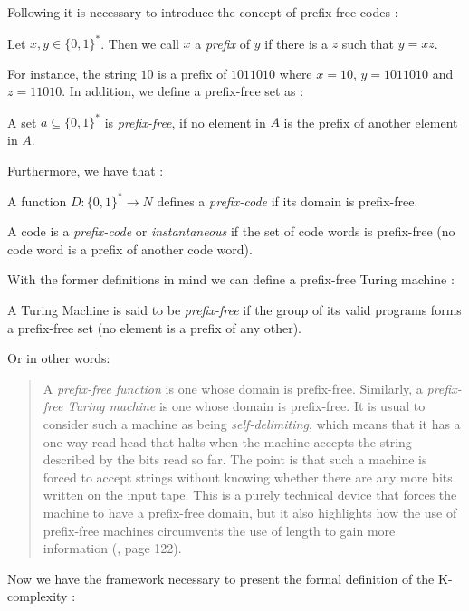 Following it is necessary to introduce the concept of prefix-free codes \cite{kolmo_book}:

\begin{defn}
Let $x,y \in \{0,1\}^{*}$. Then we call $x$ a \textit{prefix} of $y$ if there is a $z$ such that $y=xz$.
\end{defn}

For instance, the string $10$ is a prefix of $1011010$ where $x=10$, $y=1011010$ and $z=11010$.  In addition, we define a prefix-free set as \cite{kolmo_book}:

\begin{defn}
A set $a \subseteq \{0,1\}^{*}$ is \textit{prefix-free}, if no element in $A$ is the prefix of another element in $A$.
\end{defn}

Furthermore, we have that \cite{kolmo_book}:
\begin{defn}
A function $D: \{0,1\}^{*} \rightarrow N$ defines a \textit{prefix-code} if its domain is prefix-free.
\end{defn}

\begin{defn}
A code is a \textit{prefix-code} or \textit{instantaneous} if the set of code words is prefix-free (no code word is a prefix of another code word).
\end{defn}

With the former definitions in mind we can define a prefix-free Turing machine \cite{decomposition}:
\begin{defn}
\label{prefix-free}
A Turing Machine is said to be \textit{prefix-free} if the group of its valid programs forms a prefix-free set (no element is a prefix of any other).
\end{defn}

Or in other words:
\begin{quote}
A \textit{prefix-free function} is one whose domain is prefix-free. Similarly, a \textit{prefix-free Turing machine} is one whose domain is prefix-free. It is usual to consider such a machine as being \textit{self-delimiting}, which means that it has a one-way read head that halts when the machine accepts the string described by the bits read so far. The point is that such a machine is forced to accept strings without knowing whether there are any more bits written on the input tape. This is a purely technical device that forces the machine to have a prefix-free domain, but it also highlights how the use of prefix-free machines circumvents the use of length to gain more information (\cite{kolmo_book2}, page 122).
\end{quote}
Now we have the framework necessary to present the formal definition of the K-complexity \cite{decomposition}:

